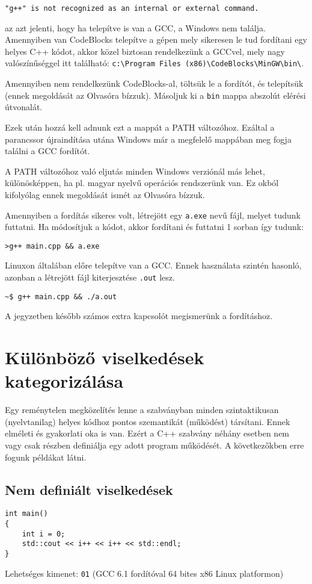 \documentclass[../cpp_book/cpp_book.tex]{subfiles}
\begin{document}
	{\centering\texttt{"g++" is not recognized as an internal or external command.}\par}
	
	az azt jelenti, hogy ha telepítve is van a GCC, a Windows nem találja. Amennyiben van CodeBlocks telepítve a gépen mely sikeresen le tud fordítani egy helyes C++ kódot, akkor közel biztosan rendelkezünk a GCCvel, mely nagy valószínűséggel itt található: \texttt{c:\textbackslash Program Files (x86)\textbackslash CodeBlocks\textbackslash MinGW\textbackslash bin\textbackslash }.
	 
	Amennyiben nem rendelkezünk CodeBlocks-al, töltsük le a fordítót, és telepítsük (ennek megoldását az Olvasóra bízzuk). Másoljuk ki a \texttt{bin} mappa abszolút elérési útvonalát.
	 
	Ezek után hozzá kell adnunk ezt a mappát a PATH változóhoz. Ezáltal a parancssor újraindítása utána Windows már a megfelelő mappában meg fogja találni a GCC fordítót.
	\begin{note}
	 	A PATH változóhoz való eljutás minden Windows verziónál más lehet, különösképpen, ha pl. magyar nyelvű operációs rendszerünk van. Ez okból kifolyólag ennek megoldását ismét az Olvasóra bízzuk.
	\end{note}
	Amennyiben a fordítás sikeres volt, létrejött egy \texttt{a.exe} nevű fájl, melyet tudunk futtatni. Ha módosítjuk a kódot, akkor fordítani és futtatni 1 sorban így tudunk:
	\begin{lstlisting}
>g++ main.cpp && a.exe
	\end{lstlisting}
	Linuxon általában előre telepítve van a GCC. Ennek használata szintén hasonló, azonban a létrejött fájl kiterjesztése \texttt{.out} lesz.
	\begin{lstlisting}
~$ g++ main.cpp && ./a.out
	\end{lstlisting}
	A jegyzetben később számos extra kapcsolót megismerünk a fordításhoz.

	\section{Különböző viselkedések kategorizálása}
	Egy reménytelen megközelítés lenne a szabványban minden szintaktikusan (nyelvtanilag) helyes kódhoz pontos szemantikát (működést) társítani. Ennek  elméleti és gyakorlati oka is van. Ezért a C++ szabvány néhány esetben nem vagy csak részben definiálja egy adott program működését. A következőkben erre fogunk példákat látni.

	\subsection{Nem definiált viselkedések}
	\begin{lstlisting}
int main()
{
	int i = 0;
	std::cout << i++ << i++ << std::endl;
}
	\end{lstlisting}
	Lehetséges kimenet: \texttt{01} (GCC 6.1 fordítóval 64 bites x86 Linux platformon)
	
\end{document}
